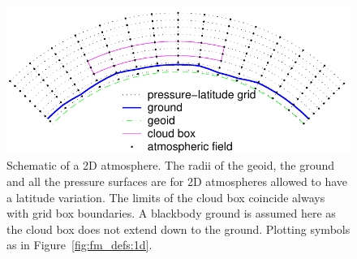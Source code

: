  \begin{figure}[!t]
  \begin{center}
   \includegraphics*[width=0.95\hsize]{Figs/atm_dim_2d}
   \caption{ Schematic of a 2D atmosphere. The radii of the geoid, the ground
     and all the pressure surfaces are for 2D atmospheres allowed to
     have a latitude variation. The limits of the cloud box coincide
     always with grid box boundaries. A blackbody ground is assumed
     here as the cloud box does not extend down to the ground.
     Plotting symbols as in Figure~\ref{fig:fm_defs:1d}. }
   \label{fig:fm_defs:2d}
  \end{center}
 \end{figure}


\label{sec:fm_defs:altitudes}

